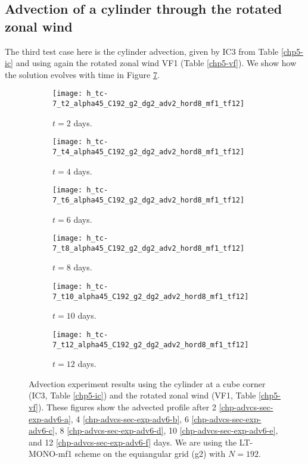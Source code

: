 \newpage
\subsection{Advection of a cylinder through the rotated zonal wind}
The third test case here is the cylinder advection, given by IC3 from Table \ref{chp5-ic} and using again the rotated zonal wind VF1 (Table \ref{chp5-vf}).
We show how the solution evolves with time in Figure \ref{chp-advcs-sec-exp-adv6}.

\begin{figure}[!htb]
	\centering
	\begin{subfigure}{0.45\textwidth}
		\centering
		\texttt{[image: h\_tc-7\_t2\_alpha45\_C192\_g2\_dg2\_adv2\_hord8\_mf1\_tf12]}
		\caption{$t=2$ days.\label{chp-advcs-sec-exp-adv6-a}}
	\end{subfigure}
	\begin{subfigure}{0.45\textwidth}
		\centering
		\texttt{[image: h\_tc-7\_t4\_alpha45\_C192\_g2\_dg2\_adv2\_hord8\_mf1\_tf12]}
		\caption{$t=4$ days.\label{chp-advcs-sec-exp-adv6-b}}
	\end{subfigure}
	
	\begin{subfigure}{0.45\textwidth}
		\centering
		\texttt{[image: h\_tc-7\_t6\_alpha45\_C192\_g2\_dg2\_adv2\_hord8\_mf1\_tf12]}
		\caption{$t=6$ days.\label{chp-advcs-sec-exp-adv6-c}}
	\end{subfigure}	
	\begin{subfigure}{0.45\textwidth}
		\centering
		\texttt{[image: h\_tc-7\_t8\_alpha45\_C192\_g2\_dg2\_adv2\_hord8\_mf1\_tf12]}
		\caption{$t=8$ days.\label{chp-advcs-sec-exp-adv6-d}}
	\end{subfigure}
	
	\begin{subfigure}{0.45\textwidth}
		\centering
		\texttt{[image: h\_tc-7\_t10\_alpha45\_C192\_g2\_dg2\_adv2\_hord8\_mf1\_tf12]}
		\caption{$t=10$ days.\label{chp-advcs-sec-exp-adv6-e}}
	\end{subfigure}
	\begin{subfigure}{0.45\textwidth}
		\centering
		\texttt{[image: h\_tc-7\_t12\_alpha45\_C192\_g2\_dg2\_adv2\_hord8\_mf1\_tf12]}
		\caption{$t=12$ days.\label{chp-advcs-sec-exp-adv6-f}}
	\end{subfigure}
	\caption{Advection experiment results using the cylinder at a cube corner (IC3, Table \ref{chp5-ic}) and 
		the rotated zonal wind (VF1, Table \ref{chp5-vf}).
		These figures show the advected profile after
		2 \eqref{chp-advcs-sec-exp-adv6-a}, 
		4  \eqref{chp-advcs-sec-exp-adv6-b},
		6  \eqref{chp-advcs-sec-exp-adv6-c},
		8  \eqref{chp-advcs-sec-exp-adv6-d},
		10  \eqref{chp-advcs-sec-exp-adv6-e},
		and 12  \eqref{chp-advcs-sec-exp-adv6-f} days.
		We are using the LT-MONO-mf1 scheme on the equiangular grid (g2) with $N=192$. \label{chp-advcs-sec-exp-adv6}}
\end{figure}


